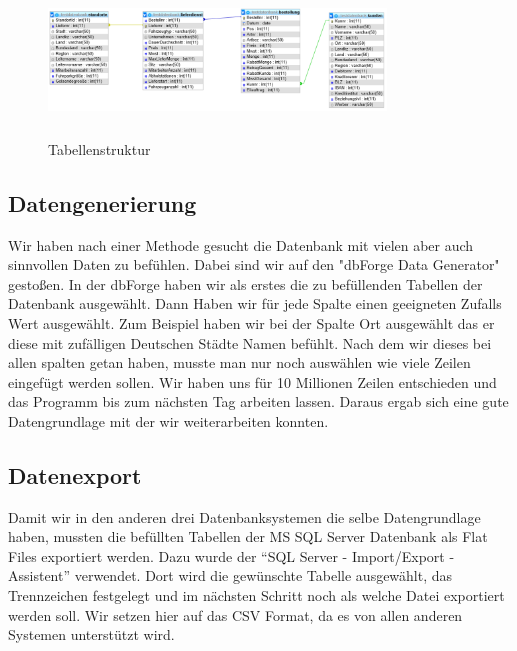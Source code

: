 \documentclass[a4paper, 12pt]{scrartcl}
\begin{document}
\begin{figure}[H]
\centering
\includegraphics[height=4cm,width=0.8\textwidth]{DBUebersicht.PNG}
\caption{Tabellenstruktur}
\end{figure}
 
\subsection{Datengenerierung}
Wir haben nach einer Methode gesucht die Datenbank mit vielen aber auch sinnvollen Daten zu befühlen. Dabei sind wir auf  den "dbForge Data Generator" gestoßen.
In der dbForge haben wir als erstes die zu befüllenden Tabellen der Datenbank ausgewählt. Dann Haben wir für jede Spalte einen geeigneten Zufalls Wert ausgewählt. 
Zum Beispiel haben wir bei der Spalte Ort ausgewählt das er diese mit zufälligen Deutschen Städte Namen befühlt.
Nach dem wir dieses bei allen spalten getan haben, musste man nur noch auswählen wie viele Zeilen eingefügt werden sollen. Wir haben uns für 10 Millionen Zeilen entschieden und das Programm bis zum nächsten Tag arbeiten lassen. Daraus ergab sich eine gute Datengrundlage mit der wir weiterarbeiten konnten.


\subsection{Datenexport}
Damit wir in den anderen drei Datenbanksystemen die selbe Datengrundlage haben, mussten die befüllten Tabellen der MS SQL Server Datenbank als Flat Files exportiert werden. Dazu wurde der "`SQL Server - Import/Export - Assistent"' verwendet. Dort wird die gewünschte Tabelle ausgewählt, das Trennzeichen festgelegt und im nächsten Schritt noch als welche Datei exportiert werden soll. Wir setzen hier auf das CSV Format, da es von allen anderen Systemen unterstützt wird. 
\end{document}
